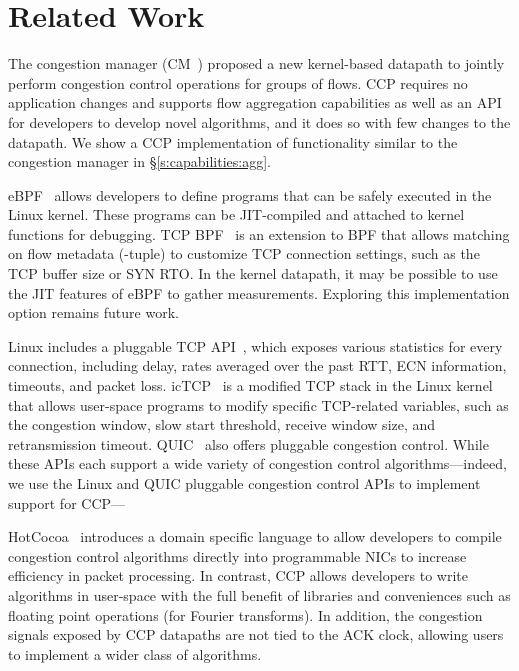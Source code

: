 \section{Related Work}
\label{s:relwork}
The congestion manager (CM~\cite{cm}) proposed a new kernel-based datapath to jointly perform congestion control operations for groups of flows. CCP requires no application changes and supports flow aggregation capabilities as well as an API for developers to develop novel algorithms, and it does so with few changes to the datapath. We show a CCP implementation of functionality similar to the congestion manager in \S\ref{s:capabilities:agg}.

eBPF~\cite{ebpf} allows developers to define programs that can be safely executed in the Linux kernel. These programs can be JIT-compiled and attached to kernel functions for debugging. TCP BPF~\cite{tcpbpf} is an extension to BPF that allows matching on flow metadata (-tuple) to customize TCP connection settings, such as the TCP buffer size or SYN RTO.
In the kernel datapath, it may be possible to use the JIT features of eBPF to gather measurements.
Exploring this implementation option remains future work.

Linux includes a pluggable TCP API~\cite{lwn-pluggable-tcp}, which exposes various statistics for every connection, including delay, rates averaged over the past RTT, ECN information, timeouts, and packet loss.
icTCP~\cite{icTCP} is a modified TCP stack in the Linux kernel that allows user-space programs to modify specific TCP-related variables, such as the congestion window, slow start threshold, receive window size, and retransmission timeout. 
QUIC~\cite{quic} also offers pluggable congestion control. 
While these APIs each support a wide variety of congestion control algorithms---indeed, we use the Linux and QUIC pluggable congestion control APIs to implement support for CCP---

HotCocoa~\cite{hotcocoa} introduces a domain specific language to allow developers to compile congestion control algorithms directly into  programmable NICs to increase efficiency in packet processing. In contrast, CCP allows developers to write algorithms in user-space with the full benefit of libraries and conveniences such as  floating point operations (\eg for Fourier transforms). 
In addition, the congestion signals exposed by CCP datapaths are not tied to the ACK clock, allowing users to implement a wider class of algorithms. 


